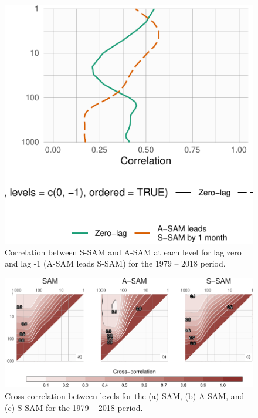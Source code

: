 \documentclass[smallextended]{svjour3}       %
\begin{document}
\begin{figure}
\includegraphics{cor-lev-1} \caption{Correlation between S\nobreakdash-SAM and A\nobreakdash-SAM at each level for lag zero and lag -1 (A\nobreakdash-SAM leads S\nobreakdash-SAM) for the 1979 -- 2018 period.}\label{fig:cor-lev}
\end{figure}

\begin{figure}
\includegraphics{cross-correlation-1} \caption{Cross correlation between levels for the (a) SAM, (b) A\nobreakdash-SAM, and (c) S\nobreakdash-SAM for the 1979 -- 2018 period.}\label{fig:cross-correlation}
\end{figure}
\end{document}

